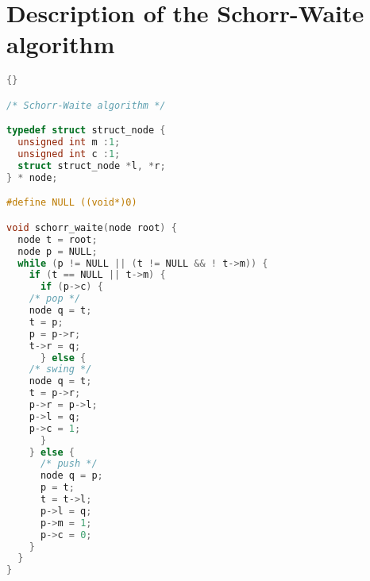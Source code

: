 
\section{Description of the Schorr-Waite algorithm}

\begin{lstlisting}[language=C]{}

/* Schorr-Waite algorithm */

typedef struct struct_node {
  unsigned int m :1;
  unsigned int c :1;
  struct struct_node *l, *r;
} * node;

#define NULL ((void*)0)

void schorr_waite(node root) {
  node t = root;
  node p = NULL;
  while (p != NULL || (t != NULL && ! t->m)) {
    if (t == NULL || t->m) {
      if (p->c) {
	/* pop */
	node q = t;
	t = p;
	p = p->r;
	t->r = q;
      } else {
	/* swing */
	node q = t;
	t = p->r;
	p->r = p->l;
	p->l = q;
	p->c = 1;
      }
    } else {
      /* push */
      node q = p;
      p = t;
      t = t->l;
      p->l = q;
      p->m = 1;
      p->c = 0;
    }
  }
}
\end{lstlisting}

